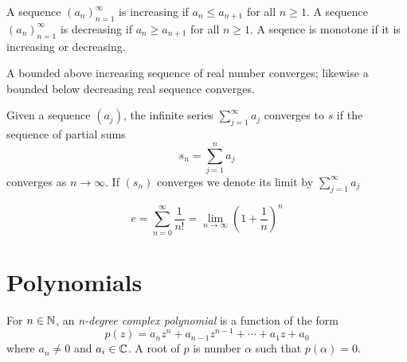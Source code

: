 \documentclass[12pt]{article}
\begin{document}
\begin{definition}
	A sequence $(a_n)^{\infty}_{n=1}$ is increasing if $a_n \leq a_{n+1}$ for all $n \geq 1$. A sequence $(a_n)^{\infty}_{n=1}$ is decreasing if $a_n \geq a_{n+1}$ for all $n \geq 1$.
	A seqence is monotone if it is increasing or decreasing.
\end{definition}
\begin{theorem}
	A bounded above increasing sequence of real number converges; likewise a bounded below decreasing real sequence converges.
\end{theorem}

\begin{definition}
	Given a sequence $(a_j)$, the infinite series $\sum_{j=1}^{\infty} a_j$ converges to $s$ if the sequence of partial sums 
	$$s_n = \sum ^{n}_{j=1}a_j$$
	converges as $n \to \infty$. If $(s_n)$ converges we denote its limit by $\sum^{\infty}_{j=1}a_j$
\end{definition}
\begin{definition}	
	\begin{equation}
		e=\sum^{\infty}_{n=0}\frac{1}{n!}=\lim_{n\to\infty}\left(1+\frac{1}{n}\right)^n
	\end{equation}
\end{definition}

\section{Polynomials}

\begin{definition}
	For $n\in \mathbb{N}$, an \emph{n-degree complex polynomial} is a function of the form 
	\begin{equation}
		p(z)=a_nz^n+a_{n-1}z^{n-1}+\cdots+a_1z+a_0
	\end{equation}
	where $a_n\neq 0$ and $a_i \in \mathbb{C}$. A root of $p$ is number $\alpha$ such that $p(\alpha)=0$. 
\end{definition}
\end{document}
